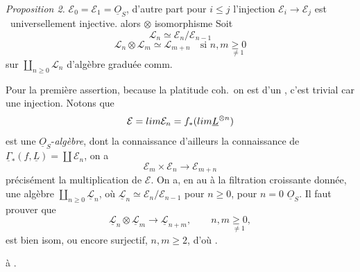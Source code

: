 \documentclass[11pt,a4paper]{article}
\begin{document}
\emph{Proposition 2.} $\mathcal{E}_0=\mathcal{E}_1=\underline{O}_S$, d'autre part
pour $i\leqslant j$ l'injection
$\mathcal{E}_i \to \mathcal{E}_j$ est \ universellement injective.
 \ill{} alors \ill{}
\ill{} \ill{} $\otimes$ \ill{} isomorphisme
Soit 
\[
\mathcal{L}_n \simeq \mathcal{E}_{n}/\mathcal{E}_{n-1}
\]
\[
\mathcal{L}_n\otimes\mathcal{L}_m \simeq \mathcal{L}_{m+n} \quad \text{si } n,m
\underset{\neq 1}{\geqslant 0}
\]
\struck{\ill{} \ill{}}  sur $\coprod_{n\geqslant 0}\mathcal{L}_n$
\struck{\ill{}} d'algèbre graduée comm.

Pour la première assertion, because la platitude coh.\ on est  d'un ,  c'est trivial car  une injection.
Notons que
\[
\mathcal{E} = \varinjlim \mathcal{E}_n = f_*(\varinjlim \underline{L}^{\otimes n})
\]
est une $\underline{O}_S$-\emph{algèbre}, dont la connaissance d'ailleurs
 la connaissance de
$\underline{\Gamma}_*(f,\underline{L})=\coprod \mathcal{E}_n$, \ill{} on a
\[
\mathcal{E}_m\times\mathcal{E}_n \longrightarrow \mathcal{E}_{m+n}
\]
\ill{} précisément  la multiplication de $\mathcal{E}$. On a, en  au  à la filtration croissante donnée, une
algèbre \ill{} $\coprod_{n\geqslant 0}\underline{\mathcal{L}}_n$, où
$\underline{\mathcal{L}}_n \simeq \mathcal{E}_n/\mathcal{E}_{n-1}$ pour
$n\geqslant 0$, \ill{} \ill{} pour $n=0$ \ill{} $\underline{O}_S$. Il faut prouver
que
\[
\underline{\mathcal{L}}_n\otimes\underline{\mathcal{L}}_m \longrightarrow
\underline{\mathcal{L}}_{n+m}, \qquad n,m \underset{\neq 1}{\geqslant 0},
\]
\struck{\ill{}} est bien isom, ou encore surjectif, \struck{\ill{} \ill{}
\ill{}} \struck{\ill{} \ill{} \ill{} \ill{}} \ill{} \ill{} $n,m\geqslant 2$, d'où
\ill{} \ill{}.

\ill{}  à .
\end{document}
